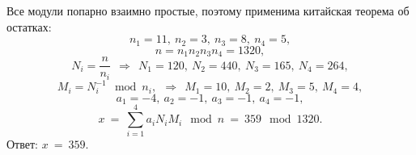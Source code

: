 Все модули попарно взаимно простые, поэтому применима китайская теорема об остатках:
    \[ n_1 = 11, ~ n_2 = 3, ~ n_3 = 8, ~ n_4 = 5, \]
    \[ n = n_1 n_2 n_3 n_4 = 1320, \]
    \[ N_i = \frac{n}{n_i} ~~ \Rightarrow ~~ N_1 = 120, ~ N_2 = 440, ~ N_3 = 165, ~ N_4 = 264, \]
    \[ M_i = N_i^{-1} \mod n_i, ~~ \Rightarrow ~~ M_1 = 10, ~ M_2 = 2, ~ M_3 = 5, ~ M_4 = 4, \]
    \[ a_1 = -4, ~ a_2 = -1, ~ a_3 = -1, ~ a_4 = -1, \]
    \[ x ~=~ \sum_{i=1}^4 a_i N_i M_i \mod n ~=~ 359 \mod 1320. \]
Ответ: $x ~=~ 359$.
\exampleend
